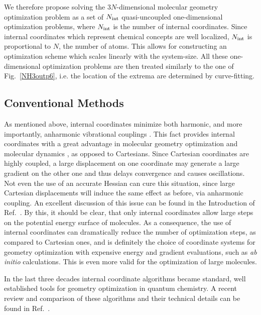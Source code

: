 \documentclass[prl,twocolumn,showpacs,twocolumngrid,superbib]{revtex4}
\begin{document}
\pagebreak

We therefore propose solving the $3N$-dimensional molecular geometry 
optimization problem as a set of $N_{\rm int}$  
quasi-uncoupled one-dimensional 
optimization problems, where $N_{\rm int}$ is the number of internal 
coordinates. Since internal coordinates which represent chemical
concepts are well localized, $N_{\rm int}$ is proportional to $N$, the number of
atoms. This allows for constructing an optimization scheme 
which scales linearly with the system-size.
All these one-dimensional optimization problems are then treated similarly
to the one of Fig.~\ref{NH3outp6}, i.e. the location of the extrema
are determined by curve-fitting.

\subsection{Conventional Methods}
As mentioned above, internal coordinates minimize both harmonic, and
more importantly, anharmonic vibrational couplings 
\cite{pulay_69,fogarasi_diaghess,Pulay_natural_internals,pulay_review,pulay_dynamics}.
This fact provides internal coordinates with a great advantage 
in molecular
geometry optimization \cite{Pulay_natural_internals} 
and molecular dynamics \cite{pulay_dynamics}, as opposed to Cartesians.
Since Cartesian coordinates are highly coupled, a large displacement
on one coordinate may generate a large gradient on the other one
and thus delays convergence and causes oscillations. 
Not even the use of an accurate Hessian can cure this situation,
since large Cartesian displacements will induce the same effect 
as before, via anharmonic
coupling. An excellent discussion of this issue can be found in 
the Introduction of Ref.~\cite{Pulay_natural_internals}.
By this, it should be clear, that only internal coordinates 
allow large steps on the potential energy surface of molecules.
As a consequence, the use of internal coordinates can dramatically
reduce the number of optimization steps, as compared to Cartesian ones,
and is definitely the choice of coordinate systems for geometry optimization
with expensive energy and gradient evaluations, such as {\it ab initio}
calculations. This is even more valid for the optimization
of large molecules.

In the last three decades internal coordinate algorithms 
became standard, well established tools for geometry optimization 
in quantum chemistry. A recent review and comparison 
of these algorithms and their technical
details can be found in Ref.~\cite{bakken}.
\end{document}
